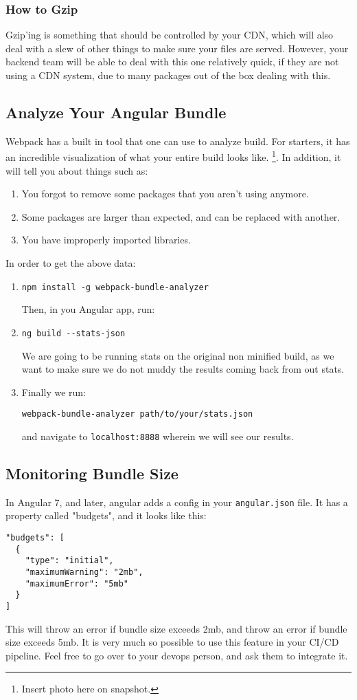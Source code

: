 \subsubsection{ How to Gzip }
Gzip'ing is something that should be controlled by your CDN, which will also 
deal with a slew of other things to make sure your files are served. However, 
your backend team will be able to deal with this one relatively quick, if they 
are not using a CDN system, due to many packages out of the box dealing with 
this. 

\subsection{Analyze Your Angular Bundle}
Webpack has a built in tool that one can use to analyze build. For starters, 
it has an incredible visualization of what your entire build looks like.
\footnote{Insert photo here on snapshot.}. In addition, it will tell you about 
things such as: 
\begin{enumerate}
  \item You forgot to remove some packages that you aren't using anymore.
  \item Some packages are larger than expected, and can be replaced with
  another.
  \item You have improperly imported libraries.
\end{enumerate}

In order to get the above data: 
\begin{enumerate}
\item 
\begin{verbatim}
npm install -g webpack-bundle-analyzer 
\end{verbatim}
Then, in you Angular app, run: 
\item 
\begin{verbatim}
ng build --stats-json
\end{verbatim}
We are going to be running stats on the original non minified build, as we 
want to make sure we do not muddy the results coming back from out stats. 
\item 
Finally we run: 
\begin{verbatim}
webpack-bundle-analyzer path/to/your/stats.json  
\end{verbatim}
and navigate to \lstinline{localhost:8888} wherein we will see our results.
\end{enumerate}

\subsection{Monitoring Bundle Size}
In Angular 7, and later, angular adds a config in your \lstinline{angular.json}
file. It has a property called "budgets", and it looks like this: 
\begin{lstlisting}
"budgets": [
  {
    "type": "initial",
    "maximumWarning": "2mb",
    "maximumError": "5mb"
  }
]   
\end{lstlisting}

This will throw an error if bundle size exceeds 2mb, and throw an error if 
bundle size exceeds 5mb. It is very much so possible to use this feature in
your CI/CD pipeline. Feel free to go over to your devops person, and ask them 
to integrate it. 